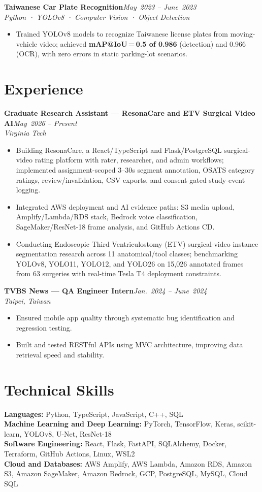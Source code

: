 \documentclass[10pt,letterpaper]{article}
\newcommand{\resumeItem}[1]{\item\small #1}
\newcommand{\entryHeaderSingle}[3]{%
  \noindent\textbf{#1}\hfill \textit{\small\color{muted}#2}\\
  {\small\textit{\color{muted}#3}}
  \vspace{1pt}
}
\newcommand{\skillLine}[2]{\small\textbf{#1:} #2\\[1pt]}
\begin{document}
\entryHeaderSingle{Taiwanese Car Plate Recognition}{May~2023 -- June~2023}
                  {Python · YOLOv8 · Computer Vision · Object Detection}
\begin{itemize}[leftmargin=1.5em, itemsep=0pt, topsep=1pt]
  \resumeItem{Trained YOLOv8 models to recognize Taiwanese license plates from moving-vehicle video;
    achieved \textbf{mAP@IoU\,=\,0.5 of 0.986} (detection) and 0.966 (OCR), with zero errors in
    static parking-lot scenarios.}
\end{itemize}

\section{Experience}

\entryHeaderSingle{Graduate Research Assistant --- ResonaCare and ETV Surgical Video AI}{May~2026 -- Present}
                  {Virginia Tech}
\begin{itemize}[leftmargin=1.5em, itemsep=0pt, topsep=1pt]
  \resumeItem{Building ResonaCare, a React/TypeScript and Flask/PostgreSQL surgical-video rating platform with rater, researcher, and admin workflows; implemented assignment-scoped 3--30s segment annotation, OSATS category ratings, review/invalidation, CSV exports, and consent-gated study-event logging.}
  \resumeItem{Integrated AWS deployment and AI evidence paths: S3 media upload, Amplify/Lambda/RDS stack, Bedrock voice classification, SageMaker/ResNet-18 frame analysis, and GitHub Actions CD.}
  \resumeItem{Conducting Endoscopic Third Ventriculostomy (ETV) surgical-video instance segmentation research across 11 anatomical/tool classes; benchmarking YOLOv8, YOLO11, YOLO12, and YOLO26 on 15,026 annotated frames from 63 surgeries with real-time Tesla T4 deployment constraints.}
\end{itemize}
\vspace{1pt}

\entryHeaderSingle{TVBS News --- QA Engineer Intern}{Jan.~2024 -- June~2024}
                  {Taipei, Taiwan}
\begin{itemize}[leftmargin=1.5em, itemsep=0pt, topsep=1pt]
  \resumeItem{Ensured mobile app quality through systematic bug identification and regression testing.}
  \resumeItem{Built and tested RESTful APIs using MVC architecture, improving data retrieval speed and stability.}
\end{itemize}
\section{Technical Skills}

\skillLine{Languages}{Python, TypeScript, JavaScript, C++, SQL}
\skillLine{Machine Learning and Deep Learning}{PyTorch, TensorFlow, Keras, scikit-learn, YOLOv8, U-Net, ResNet-18}
\skillLine{Software Engineering}{React, Flask, FastAPI, SQLAlchemy, Docker, Terraform, GitHub Actions, Linux, WSL2}
\skillLine{Cloud and Databases}{AWS Amplify, AWS Lambda, Amazon RDS, Amazon S3, Amazon SageMaker, Amazon Bedrock, GCP, PostgreSQL, MySQL, Cloud SQL}
\end{document}
